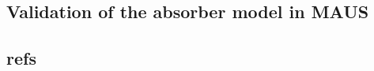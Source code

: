 \subsection{Validation of the absorber model in MAUS}
\label{SubSect:Absorber_Validation}



\subsection{refs}
